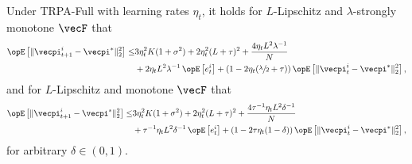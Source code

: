 \begin{lemma}\label{lemma:full_error_recurrence}
    Under TRPA-Full with learning rates $\eta_t$, it holds for $L$-Lipschitz and $\lambda$-strongly monotone $\vecF$ that
    \begin{align*}
    \Exop\left[\| \vecpi_{t+1}^i - \vecpi^* \|_2^2\right] \leq &3\eta_t^2 K(1 + \sigma^2) + 2\eta_t^2(L+\tau)^2 + \frac{4\eta_t L^2 \lambda^{-1}}{ N } \\
        & + 2\eta_t L^2 \lambda^{-1} \Exop\left[e_t^i\right] + \left(1 - 2 \eta_t(\sfrac{\lambda}{2} + \tau)\right) \Exop\left[\| \vecpi_t^i - \vecpi^* \|_2^2\right],
\end{align*}
and for $L$-Lipschitz and monotone $\vecF$ that
\begin{align*}
    \Exop\left[\| \vecpi_{t+1}^i - \vecpi^* \|_2^2\right] \leq &3\eta_t^2 K(1 + \sigma^2) + 2\eta_t^2(L+\tau)^2 + \frac{4\tau^{-1} \eta_t L^2 \delta^{-1}}{ N} \\
        & + \tau^{-1}\eta_t L^2\delta^{-1} \Exop\left[e_t^i\right] + \left(1 - 2\tau \eta_t (1-\delta)\right) \Exop\left[\| \vecpi_t^i - \vecpi^* \|_2^2\right],
\end{align*}
for arbitrary $\delta \in (0,1)$.
\end{lemma}
